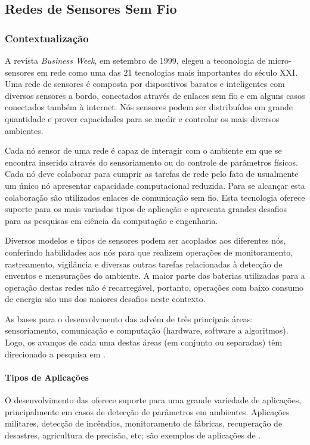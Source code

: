\subsection{Redes de Sensores Sem Fio}

\subsubsection{Contextualização}

A revista \emph{Business Week}, em setembro de 1999, elegeu a teconologia de micro-sensores em rede como uma das 21 tecnologias mais importantes do século XXI.
Uma rede de sensores é composta por dispositivos baratos e inteligentes com diversos sensores a bordo, conectados através de enlaces sem fio e em alguns casos conectados também à internet. Nós sensores podem ser distribuídos em grande quantidade e prover capacidades para se medir e controlar os mais diversos ambientes. \cite{Chong2003}

Cada nó sensor de uma rede é capaz de interagir com o ambiente em que se encontra inserido através do sensoriamento ou do controle de parâmetros físicos. Cada nó deve colaborar para cumprir as tarefas de rede pelo fato de usualmente um único nó apresentar capacidade computacional reduzida. Para se alcançar esta colaboração são utilizados enlaces de comunicação sem fio. Esta tecnologia oferece suporte para os mais variados tipos de aplicação e apresenta grandes desafios para as pesquisas em ciência da computação e engenharia. \cite{Holger2005}

Diversos modelos e tipos de sensores podem ser acoplados aos diferentes nós, conferindo habilidades aos nós para que realizem operações de monitoramento, rastreamento, vigilância e diversas outras tarefas relacionadas à detecção de enventos e mensurações do ambiente. A maior parte das baterias utilizadas para a operação destas redes não é recarregável, portanto, operações com baixo consumo de energia são uns dos maiores desafios neste contexto.\cite{Aboelaze2005}

As bases para o desenvolvmento das \rssfs advém de três principais áreas: sensoriamento, comunicação e computação (hardware, software a algoritmos). Logo, os avanços de cada uma destas áreas (em conjunto ou separadas) têm direcionado a pesquisa em \rssf. \cite{Chong2003}


\paragraph{Tipos de Aplicações}
O desenvolvimento das \rssfs oferece suporte para uma grande variedade de aplicações, principalmente em casos de detecção de parâmetros em ambientes. Aplicações militares, detecção de incêndios, monitoramento de fábricas, recuperação de desastres, agricultura de precisão, etc; são exemplos de aplicações de \rssfs.

